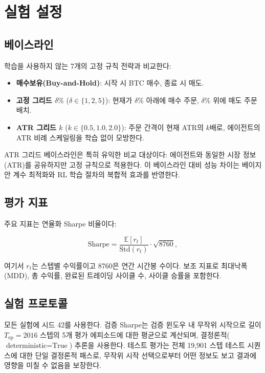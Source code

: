 \documentclass[11pt, a4paper]{article}
\begin{document}
\section{실험 설정}

\subsection{베이스라인}

학습을 사용하지 않는 7개의 고정 규칙 전략과 비교한다:

\begin{itemize}
    \item \textbf{매수보유(Buy-and-Hold)}: 시작 시 BTC 매수, 종료 시 매도.
    \item \textbf{고정 그리드 $\delta\%$} ($\delta \in \{1, 2, 5\}$):
          현재가 $\delta\%$ 아래에 매수 주문, $\delta\%$ 위에 매도 주문 배치.
    \item \textbf{ATR 그리드 $k$} ($k \in \{0.5, 1.0, 2.0\}$):
          주문 간격이 현재 ATR의 $k$배로, 에이전트의 ATR 비례 스케일링을
          학습 없이 모방한다.
\end{itemize}

ATR 그리드 베이스라인은 특히 유익한 비교 대상이다: 에이전트와 동일한 시장 정보(ATR)를
공유하지만 고정 규칙으로 적용한다.
이 베이스라인 대비 성능 차이는 베이지안 계수 최적화와 RL 학습 절차의 복합적 효과를
반영한다.

\subsection{평가 지표}

주요 지표는 연율화 Sharpe 비율이다:

\begin{equation}
    \text{Sharpe} = \frac{\mathbb{E}[r_t]}{\text{Std}(r_t)} \cdot \sqrt{8760},
    \label{eq:sharpe}
\end{equation}

여기서 $r_t$는 스텝별 수익률이고 8760은 연간 시간봉 수이다.
보조 지표로 최대낙폭(MDD), 총 수익률, 완료된 트레이딩 사이클 수,
사이클 승률을 포함한다.

\subsection{실험 프로토콜}

모든 실험에 시드 42를 사용한다.
검증 Sharpe는 검증 윈도우 내 무작위 시작으로 길이 $T_\text{ep} = 2016$ 스텝의
5개 평가 에피소드에 대한 평균으로 계산되며, 결정론적($\text{deterministic}=\text{True}$)
추론을 사용한다.
테스트 평가는 전체 19,901 스텝 테스트 시퀀스에 대한 단일 결정론적 패스로,
무작위 시작 선택으로부터 어떤 정보도 보고 결과에 영향을 미칠 수 없음을 보장한다.
\end{document}
